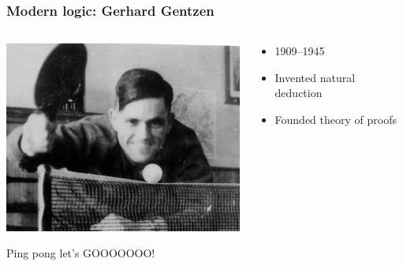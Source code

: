 \begin{frame}
  \frametitle{Modern logic: Gerhard Gentzen}

  \begin{columns}
    \begin{column}{.5\textwidth}
      \includegraphics[width=\textwidth]{../assets/gentzen}
      
      Ping pong let's GOOOOOOO!
    \end{column}
    \begin{column}{.5\textwidth}
      \begin{itemize}[<+->]
        \item 1909--1945
        \item Invented natural deduction
        \item Founded theory of proofs
      \end{itemize}
    \end{column}
  \end{columns}
\end{frame}

